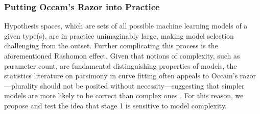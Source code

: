 \documentclass[mnsc,blindrev]{informs3}
\newcommand{\mM}{\mathcal{M}}
\newcommand{\tw}[1]{\textcolor{black}{Tong: #1}}
\begin{document}
        \subsubsection{Putting Occam's Razor into Practice}
            \label{sec:decreasing_complexity}
            Hypothesis spaces, which are sets of all possible machine learning models of a given type(s), are in practice unimaginably large, making model selection challenging from the outset. Further complicating this process is the aforementioned Rashomon effect. Given that notions of complexity, such as parameter count, are fundamental distinguishing properties of models, the statistics literature on parsimony in curve fitting often appeals to Occam's razor—plurality should not be posited without necessity—suggesting that simpler models are more likely to be correct than complex ones \citep{popper2005logic}. For this reason, we %
            propose and test the idea that stage 1 is sensitive to model complexity. %
 
\end{document}
